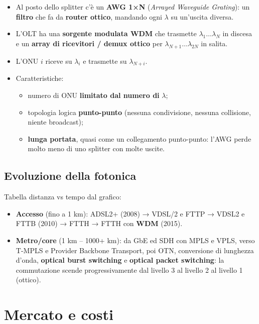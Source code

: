 \begin{itemize}
\tightlist
\item
  Al posto dello splitter c'è un \textbf{AWG 1×N} (\emph{Arrayed Waveguide Grating}): un \textbf{filtro} che fa da \textbf{router ottico}, mandando ogni \(\lambda\) su un'uscita diversa.
\item
  L'OLT ha una \textbf{sorgente modulata WDM} che trasmette \(\lambda_1 \dots \lambda_N\) in discesa e un \textbf{array di ricevitori / demux ottico} per \(\lambda_{N+1} \dots \lambda_{2N}\) in salita.
\item
  L'ONU \(i\) riceve su \(\lambda_i\) e trasmette su \(\lambda_{N+i}\).
\item
  Caratteristiche:

  \begin{itemize}
  \tightlist
  \item
    numero di ONU \textbf{limitato dal numero di} \(\lambda\);
  \item
    topologia logica \textbf{punto-punto} (nessuna condivisione, nessuna collisione, niente broadcast);
  \item
    \textbf{lunga portata}, quasi come un collegamento punto-punto: l'AWG perde molto meno di uno splitter con molte uscite.
  \end{itemize}
\end{itemize}

\subsection{Evoluzione della fotonica}

Tabella distanza vs tempo dal grafico:

\begin{itemize}
\tightlist
\item
  \textbf{Accesso} (fino a 1 km): ADSL2+ (2008) → VDSL/2 e FTTP → VDSL2 e FTTB (2010) → FTTH → FTTH con \textbf{WDM} (2015).
\item
  \textbf{Metro/core} (1 km -- 1000+ km): da GbE ed SDH con MPLS e VPLS, verso T-MPLS e Provider Backbone Transport, poi OTN, conversione di lunghezza d'onda, \textbf{optical burst switching} e \textbf{optical packet switching}: la commutazione scende progressivamente dal livello 3 al livello 2 al livello 1 (ottico).
\end{itemize}

\section{Mercato e costi}

